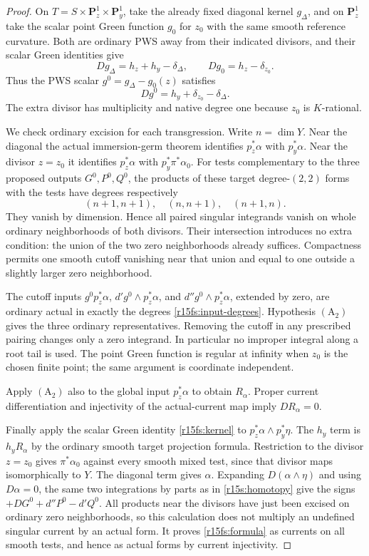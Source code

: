 \begin{proof}
On $T=S\times\mathbf P^1_z\times\mathbf P^1_y$, take
the already fixed diagonal kernel $g_\Delta$, and on
$\mathbf P^1_z$ take the scalar point Green function
$g_0$ for $z_0$ with the same smooth reference curvature.
Both are ordinary PWS away from their indicated divisors,
and their scalar Green identities give
\[
 Dg_\Delta=h_z+h_y-\delta_\Delta,
 \qquad Dg_0=h_z-\delta_{z_0}.
\]
Thus the PWS scalar $g^0=g_\Delta-g_0(z)$ satisfies
\[
                     Dg^0=h_y+\delta_{z_0}-\delta_\Delta.
\tag{FX15.3}\label{r15fs:kernel}
\]
The extra divisor has multiplicity and native degree one
because $z_0$ is $K$-rational.

We check ordinary excision for each transgression.
Write $n=\dim Y$. Near the diagonal the actual
immersion-germ theorem identifies $p_z^*\alpha$ with
$p_y^*\alpha$. Near the divisor $z=z_0$ it identifies
$p_z^*\alpha$ with $p_y^*\pi^*\alpha_0$. For tests
complementary to the three proposed outputs $G^0,P^0,Q^0$,
the products of these target degree-$(2,2)$ forms with
the tests have degrees respectively
\[
                    (n+1,n+1),\quad(n,n+1),\quad(n+1,n).
\tag{FX15.4}\label{r15fs:overdegree}
\]
They vanish by dimension. Hence all paired singular
integrands vanish on whole ordinary neighborhoods of
both divisors. Their intersection introduces no extra
condition: the union of the two zero neighborhoods
already suffices. Compactness permits one smooth cutoff
vanishing near that union and equal to one outside a
slightly larger zero neighborhood.

The cutoff inputs $g^0p_z^*\alpha$,
$d'g^0\wedge p_z^*\alpha$, and
$d''g^0\wedge p_z^*\alpha$, extended by zero, are
ordinary actual in exactly the degrees
\eqref{r15fs:input-degrees}. Hypothesis $(\mathrm A_2)$
gives the three ordinary representatives. Removing the
cutoff in any prescribed pairing changes only a zero
integrand. In particular no improper integral along a
root tail is used. The point Green function is regular
at infinity when $z_0$ is the chosen finite point;
the same argument is coordinate independent.

Apply $(\mathrm A_2)$ also to the global input
$p_z^*\alpha$ to obtain $R_\alpha$. Proper current
differentiation and injectivity of the actual-current
map imply $DR_\alpha=0$.

Finally apply the scalar Green identity
\eqref{r15fs:kernel} to $p_z^*\alpha\wedge p_y^*\eta$.
The $h_y$ term is $h_yR_\alpha$ by the ordinary smooth
target projection formula. Restriction to the divisor
$z=z_0$ gives $\pi^*\alpha_0$ against every smooth
mixed test, since that divisor maps isomorphically to
$Y$. The diagonal term gives $\alpha$. Expanding
$D(\alpha\wedge\eta)$ and using $D\alpha=0$, the
same two integrations by parts as in
\eqref{r15s:homotopy} give the signs
$+DG^0+d''P^0-d'Q^0$. All products near the divisors
have just been excised on ordinary zero neighborhoods,
so this calculation does not multiply an undefined
singular current by an actual form. It proves
\eqref{r15fs:formula} as currents on all smooth tests,
and hence as actual forms by current injectivity.
\end{proof}

